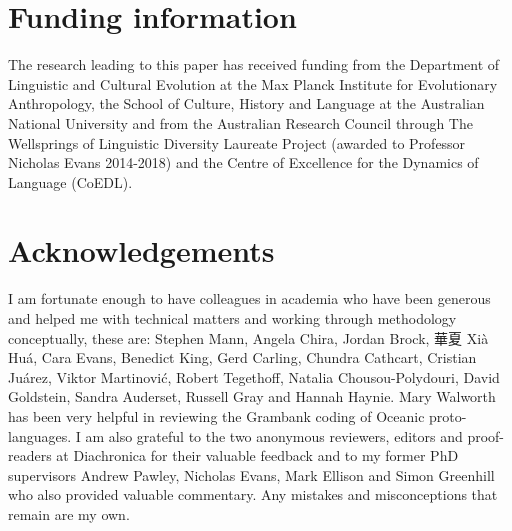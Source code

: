 \documentclass[12pt,letterpaper]{article}
\begin{document}

\FloatBarrier

\section*{Funding information}
The research leading to this paper has received funding from the Department of Linguistic and Cultural Evolution at the Max Planck Institute for Evolutionary Anthropology, the School of Culture, History and Language at the Australian National University and from the Australian Research Council through The Wellsprings of Linguistic Diversity Laureate Project (awarded to Professor Nicholas Evans 2014-2018) and the Centre of Excellence for the Dynamics of Language (CoEDL).

\newpage
\section*{Acknowledgements}
I am fortunate enough to have colleagues in academia who have been generous and helped me with technical matters and working through methodology conceptually, these are: Stephen Mann, Angela Chira, Jordan Brock, 華夏 Xià Huá, Cara Evans, Benedict King, Gerd Carling, Chundra Cathcart, Cristian Juárez, Viktor Martinović, Robert Tegethoff, Natalia Chousou-Polydouri, David Goldstein, Sandra Auderset, Russell Gray and Hannah Haynie. Mary Walworth has been very helpful in reviewing the Grambank coding of Oceanic proto-languages. I am also grateful to the two anonymous reviewers, editors and proof-readers at Diachronica for their valuable feedback and to my former PhD supervisors Andrew Pawley, Nicholas Evans, Mark Ellison and Simon Greenhill who also provided valuable commentary. Any mistakes and misconceptions that remain are my own.

\end{document}
